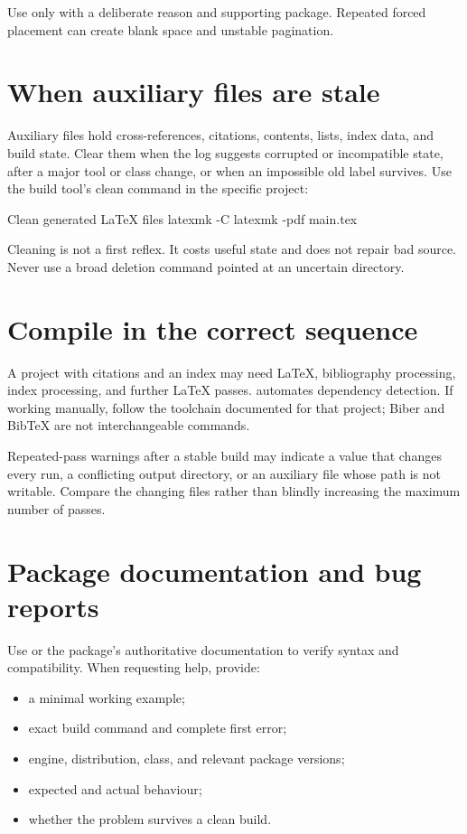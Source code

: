 Use \code{[H]} only with a deliberate reason and supporting package. Repeated
forced placement can create blank space and unstable pagination.

\section{When auxiliary files are stale}

Auxiliary files hold cross-references, citations, contents, lists, index data,
and build state. Clear them when the log suggests corrupted or incompatible
state, after a major tool or class change, or when an impossible old label
survives. Use the build tool's clean command in the specific project:

\begin{terminalcode}{Clean generated \LaTeX{} files}
latexmk -C
latexmk -pdf main.tex
\end{terminalcode}

Cleaning is not a first reflex. It costs useful state and does not repair bad
source. Never use a broad deletion command pointed at an uncertain directory.

\section{Compile in the correct sequence}

A project with citations and an index may need \LaTeX{}, bibliography processing,
index processing, and further \LaTeX{} passes.  automates dependency
detection. If working manually, follow the toolchain documented for that project;
Biber and BibTeX are not interchangeable commands.

Repeated-pass warnings after a stable  build may indicate a value
that changes every run, a conflicting output directory, or an auxiliary file
whose path is not writable. Compare the changing files rather than blindly
increasing the maximum number of passes.

\section{Package documentation and bug reports}

Use  or the package's authoritative documentation to
verify syntax and compatibility. When requesting help, provide:

\begin{itemize}
  \item a minimal working example;
  \item exact build command and complete first error;
  \item engine, distribution, class, and relevant package versions;
  \item expected and actual behaviour;
  \item whether the problem survives a clean build.
\end{itemize}


